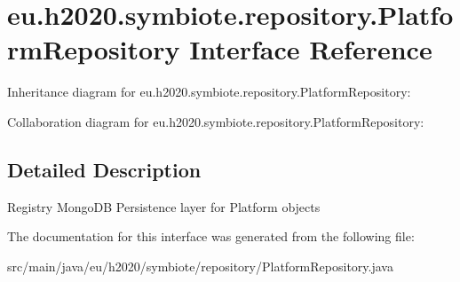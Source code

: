 \hypertarget{interfaceeu_1_1h2020_1_1symbiote_1_1repository_1_1PlatformRepository}{}\section{eu.\+h2020.\+symbiote.\+repository.\+Platform\+Repository Interface Reference}
\label{interfaceeu_1_1h2020_1_1symbiote_1_1repository_1_1PlatformRepository}


Inheritance diagram for eu.\+h2020.\+symbiote.\+repository.\+Platform\+Repository\+:


Collaboration diagram for eu.\+h2020.\+symbiote.\+repository.\+Platform\+Repository\+:


\subsection{Detailed Description}
Registry Mongo\+DB Persistence layer for Platform objects 

The documentation for this interface was generated from the following file\+:\begin{DoxyCompactItemize}
\item 
src/main/java/eu/h2020/symbiote/repository/Platform\+Repository.\+java\end{DoxyCompactItemize}
